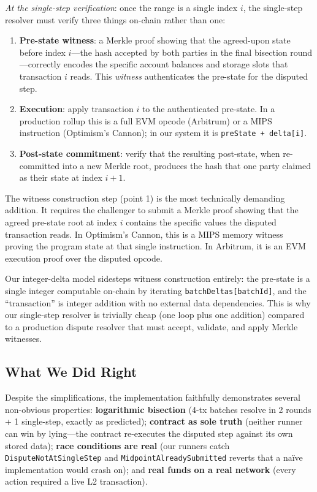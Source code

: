 \documentclass[11pt,letterpaper]{article}
\begin{document}
\emph{At the single-step verification}: once the range is a single index $i$, the single-step resolver must verify three things on-chain rather than one:
\begin{enumerate}[leftmargin=*, itemsep=2pt]
    \item \textbf{Pre-state witness}: a Merkle proof showing that the agreed-upon state before index $i$---the hash accepted by both parties in the final bisection round---correctly encodes the specific account balances and storage slots that transaction $i$ reads. This \emph{witness} authenticates the pre-state for the disputed step.
    \item \textbf{Execution}: apply transaction $i$ to the authenticated pre-state. In a production rollup this is a full EVM opcode (Arbitrum) or a MIPS instruction (Optimism's Cannon); in our system it is \texttt{preState + delta[i]}.
    \item \textbf{Post-state commitment}: verify that the resulting post-state, when re-committed into a new Merkle root, produces the hash that one party claimed as their state at index $i+1$.
\end{enumerate}

The witness construction step (point 1) is the most technically demanding addition. It requires the challenger to submit a Merkle proof showing that the agreed pre-state root at index $i$ contains the specific values the disputed transaction reads. In Optimism's Cannon, this is a MIPS memory witness proving the program state at that single instruction. In Arbitrum, it is an EVM execution proof over the disputed opcode.

Our integer-delta model sidesteps witness construction entirely: the pre-state is a single integer computable on-chain by iterating \texttt{batchDeltas[batchId]}, and the ``transaction'' is integer addition with no external data dependencies. This is why our single-step resolver is trivially cheap (one loop plus one addition) compared to a production dispute resolver that must accept, validate, and apply Merkle witnesses.

\subsection{What We Did Right}

Despite the simplifications, the implementation faithfully demonstrates several non-obvious properties: \textbf{logarithmic bisection} (4-tx batches resolve in 2 rounds + 1 single-step, exactly as predicted); \textbf{contract as sole truth} (neither runner can win by lying---the contract re-executes the disputed step against its own stored data); \textbf{race conditions are real} (our runners catch \texttt{DisputeNotAtSingleStep} and \texttt{MidpointAlreadySubmitted} reverts that a naïve implementation would crash on); and \textbf{real funds on a real network} (every action required a live L2 transaction).
\end{document}
